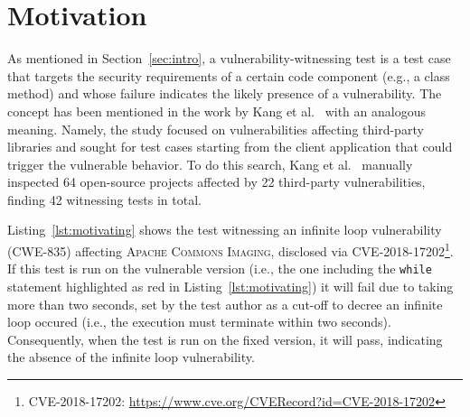 \section{Motivation}
\label{sec:background}

As mentioned in Section~\ref*{sec:intro}, a vulnerability-witnessing test is a test case that targets the security requirements of a certain code component (e.g., a class method) and whose failure indicates the likely presence of a vulnerability.
The concept has been mentioned in the work by Kang et al.~\cite{kang:issta2022:transfer} with an analogous meaning.
Namely, the study focused on vulnerabilities affecting third-party libraries and sought for test cases starting from the client application that could trigger the vulnerable behavior.
To do this search, Kang et al.~\cite{kang:issta2022:transfer} manually inspected 64 \Java open-source projects affected by 22 third-party vulnerabilities, finding 42 witnessing tests in total.


Listing~\ref{lst:motivating} shows the test witnessing an infinite loop vulnerability (CWE-835) affecting \textsc{Apache Commons Imaging}, disclosed via CVE-2018-17202\footnote{CVE-2018-17202: \url{https://www.cve.org/CVERecord?id=CVE-2018-17202}}.
If this test is run on the vulnerable version (i.e., the one including the \texttt{while} statement highlighted as red in Listing~\ref{lst:motivating}) it will fail due to taking more than two seconds, set by the test author as a cut-off to decree an infinite loop occured (i.e., the execution must terminate within two seconds).
Consequently, when the test is run on the fixed version, it will pass, indicating the absence of the infinite loop vulnerability.

